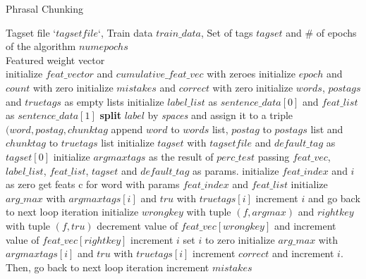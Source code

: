 \documentclass[11pt]{article}
\begin{document}
\begin{algorithm}[htb]
	\renewcommand{\algorithmicrequire}{\textbf{Input:}\hspace{10.7pt}}
	\renewcommand\algorithmicensure {\textbf{Output:} }
	\caption{Phrasal Chunking}
	\label{alg:pbg}
		\begin{algorithmic}[1]
		\vspace{3pt}
		\REQUIRE
		Tagset file `$tagsetfile$`, Train data $train\_data$, Set of tags $tagset$ and \# of epochs of the algorithm $numepochs$\\
		\ENSURE Featured weight vector \\
		\STATE initialize $feat\_vector$ and $cumulative\_feat\_vec$ with zeroes
		\STATE initialize $epoch$ and $count$ with zero
		  \STATE initialize $mistakes$ and $correct$ with zero
		    \STATE initialize $words$, $postags$ and $truetags$ as empty lists
		    \STATE initialize $label\_list$ as $sentence\_data[0]$ and $feat\_list$ as $sentence\_data[1]$	    	
		      \STATE \textbf{split} $label$ by \textit{spaces} and assign it to a triple $(word, postag, chunktag$ 
		      \STATE append $word$ to $words$ list, $postag$ to $postags$ list and $chunktag$ to $truetags$ list
		    \ENDFOR		    
		    \STATE initialize $tagset$ with $tagsetfile$ and $default\_tag$ as $tagset[0]$
		    \STATE initialize $argmaxtags$ as the result of $perc\_test$ passing $feat\_vec$, $label\_list$, $feat\_list$, $tagset$ and $default\_tag$ as params.
		    \STATE initialize $feat\_index$ and $i$ as zero
		      \STATE get feats c for word with params $feat\_index$ and $feat\_list$
		      \STATE initialize $arg\_max$ with $argmaxtags[i]$ and $tru$ with $truetags[i]$
		        \STATE increment $i$ and go back to next loop iteration		      
		      \ENDIF
		        \STATE initialize $wrongkey$ with tuple $(f, argmax)$ and $rightkey$ with tuple $(f, tru)$
		        \STATE decrement value of $feat\_vec[wrongkey]$ and increment value of $feat\_vec[rightkey]$
		      \ENDFOR
		      \STATE increment $i$
		    \ENDFOR
		    \STATE set $i$ to zero
		      \STATE initialize $arg\_max$ with $argmaxtags[i]$ and $tru$ with $truetags[i]$
		        \STATE increment $correct$ and increment $i$. Then, go back to next loop iteration
		      \ELSE
		        \STATE increment $mistakes$		      

\end{algorithmic}
\end{algorithm}
\end{document}
